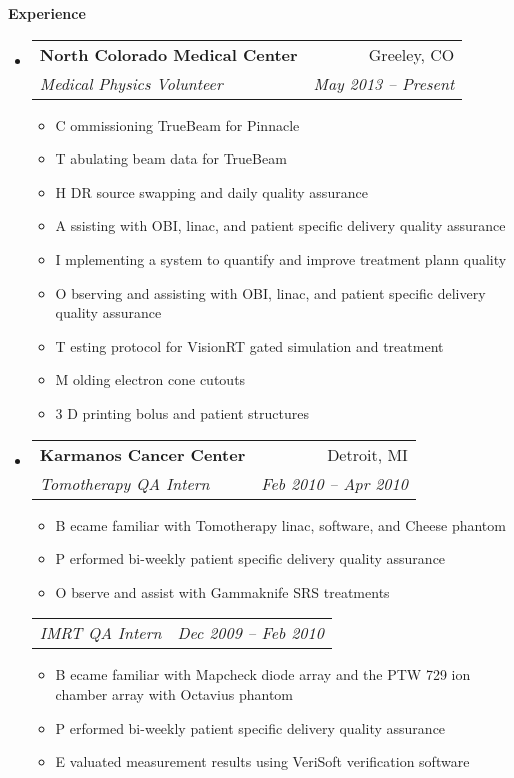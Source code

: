 \documentclass[letterpaper,10pt]{article}
\makeatletter
\newcommand{\resitem}[1]{\item #1 \vspace{-2pt}}
\newcommand{\resheading}[1]{{\large \colorbox{mygrey}{\begin{minipage}{\textwidth}{\textbf{#1 \vphantom{p\^{E}}}}\end{minipage}}}}
\newcommand{\ressubheading}[4]{
\begin{tabular*}{6.5in}{l@{\extracolsep{\fill}}r}
		\textbf{#1} & #2 \\
		\textit{#3} & \textit{#4} \\
\end{tabular*}\vspace{-6pt}}
\newcommand{\ressubsubheading}[2]{
\begin{tabular*}{6.5in}{l@{\extracolsep{\fill}}r}
		\textit{#1} & \textit{#2} \\
\end{tabular*}\vspace{-6pt}}
\makeatother
\begin{document}
\resheading{Experience}
	\begin{itemize}
		\item 
			\ressubheading{North Colorado Medical Center}{Greeley, CO}
				{Medical Physics Volunteer}{May 2013 -- Present}
				{ \footnotesize
				\begin{itemize}
    				\resitem Commissioning TrueBeam for Pinnacle
    				\resitem Tabulating beam data for TrueBeam
    				\resitem HDR source swapping and daily quality assurance
    				\resitem Assisting with OBI, linac, and patient specific delivery quality assurance
    				\resitem Implementing a system to quantify and improve treatment plann quality
    				\resitem Observing and assisting with OBI, linac, and patient specific delivery quality assurance
    				\resitem Testing protocol for VisionRT gated simulation and treatment
    				\resitem Molding electron cone cutouts
    				\resitem 3D printing bolus and patient structures
				\end{itemize}
				}
		\item
			\ressubheading{Karmanos Cancer Center}{Detroit, MI}{Tomotherapy QA Intern}{Feb 2010 -- Apr 2010}
				{ \footnotesize
				\begin{itemize}
    				\resitem Became familiar with Tomotherapy linac, software, and Cheese phantom
    				\resitem Performed bi-weekly patient specific delivery quality assurance
    				\resitem Observe and assist with Gammaknife SRS treatments
				\end{itemize}
				}
			\ressubsubheading{IMRT QA Intern}{Dec 2009 -- Feb 2010}
				{ \footnotesize
				\begin{itemize}
    				\resitem Became familiar with Mapcheck diode array and the PTW 729 ion chamber array with Octavius phantom
    				\resitem Performed bi-weekly patient specific delivery quality assurance
    				\resitem Evaluated measurement results using VeriSoft verification software
				\end{itemize}
				}
	\end{itemize}  %
\end{document}

